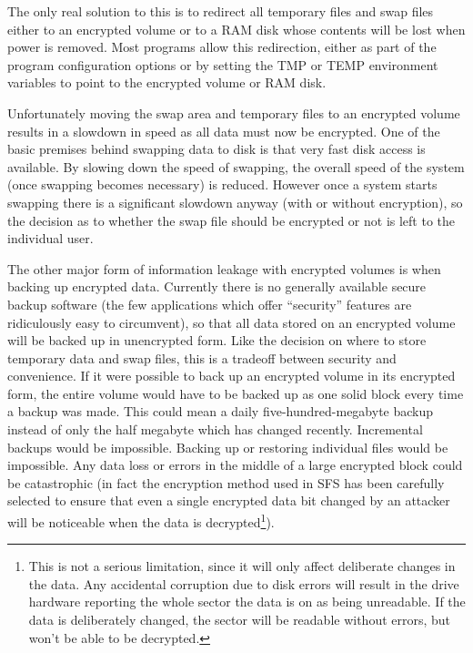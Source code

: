 The only real solution to this is to redirect all temporary files and swap
files either to an encrypted volume or to a RAM disk whose contents will be
lost when power is removed.  Most programs allow this redirection, either as
part of the program configuration options or by setting the TMP or TEMP
environment variables to point to the encrypted volume or RAM disk.

Unfortunately moving the swap area and temporary files to an encrypted volume
results in a slowdown in speed as all data must now be encrypted.  One of the
basic premises behind swapping data to disk is that very fast disk access is
available.  By slowing down the speed of swapping, the overall speed of the
system (once swapping becomes necessary) is reduced.  However once a system
starts swapping there is a significant slowdown anyway (with or without
encryption), so the decision as to whether the swap file should be encrypted or
not is left to the individual user.

The other major form of information leakage with encrypted volumes is when
backing up encrypted data.  Currently there is no generally available secure
backup software (the few applications which offer ``security'' features are
ridiculously easy to circumvent), so that all data stored on an encrypted
volume will be backed up in unencrypted form.  Like the decision on where to
store temporary data and swap files, this is a tradeoff between security and
convenience.  If it were possible to back up an encrypted volume in its
encrypted form, the entire volume would have to be backed up as one solid block
every time a backup was made.  This could mean a daily five-hundred-megabyte
backup instead of only the half megabyte which has changed recently.
Incremental backups would be impossible.  Backing up or restoring individual
files would be impossible.  Any data loss or errors in the middle of a large
encrypted block could be catastrophic (in fact the encryption method used in
SFS has been carefully selected to ensure that even a single encrypted data bit
changed by an attacker will be noticeable when the data is decrypted\footnote{
              This is not a serious limitation, since it will only affect
              deliberate changes in the data.  Any accidental corruption due to
              disk errors will result in the drive hardware reporting the whole
              sector the data is on as being unreadable.  If the data is
              deliberately changed, the sector will be readable without errors,
              but won't be able to be decrypted.
}).


